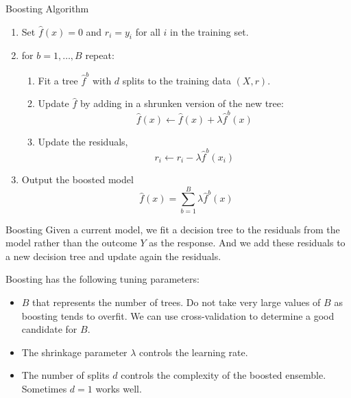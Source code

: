 \documentclass{beamer}
\begin{document}
\begin{frame}{Boosting Algorithm}
	\begin{enumerate}
		\item Set $\hat{f}(x)=0$ and $r_i=y_i$ for all $i$ in the training set. 
		\item for $b=1,\ldots, B$ repeat:
		\begin{enumerate}
			\item Fit a tree $\hat{f}^b$ with $d$ splits to the training data $(X,r)$.
			\item Update $\hat{f}$ by adding in a shrunken version of the new tree:
			\begin{equation*}
				\hat{f}(x) \leftarrow \hat{f}(x)+ \lambda \hat{f}^b (x)
			\end{equation*}
		\item Update the residuals,
		\begin{equation*}
			r_i \leftarrow r_i - \lambda \hat{f}^b(x_i)
		\end{equation*}
		\end{enumerate}
	\item Output the boosted model
	\begin{equation}
		\hat{f}(x)=\sum_{b=1}^B \lambda \hat{f}^b(x)
	\end{equation}
	\end{enumerate}
\end{frame}

\begin{frame}{Boosting}
	Given a current model, we fit a decision tree to the residuals from the model rather than the outcome $Y$ as the response. And we add these residuals to a new decision tree and update again the residuals. 
	
	Boosting has the following tuning parameters:
	
	\begin{itemize}
		\item $B$ that represents the number of trees. Do not take very large values of $B$ as boosting tends to overfit. We can use cross-validation to determine a good candidate for $B$.
		\item The shrinkage parameter $\lambda$ controls the learning rate. 
		\item The number of splits $d$ controls the complexity of the boosted ensemble. Sometimes $d=1$ works well. 
	\end{itemize} \end{frame}
\end{document}

